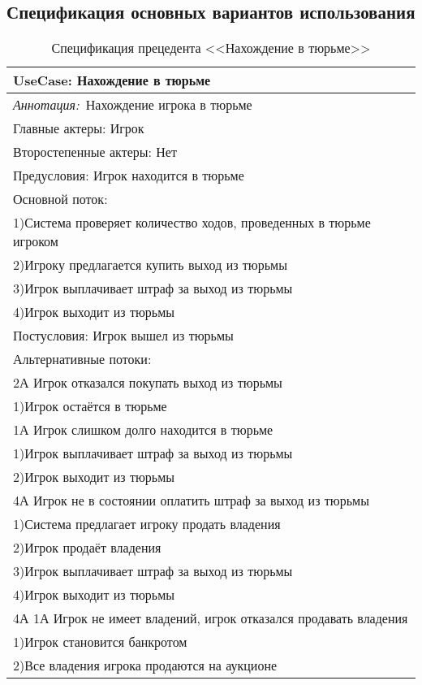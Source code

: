 \subsection{Спецификация основных вариантов использования}
\newpage
\begin{table}[h!]
\caption{Спецификация прецедента <<Нахождение в тюрьме>>}
\begin{tabular}{|l|}
    \hline
    \textbf{UseCase: Нахождение в тюрьме}\\
    \hline
    \textit{Аннотация:}\ Нахождение игрока в тюрьме\\
    \hline
    Главные актеры: Игрок \\
    \hline
    Второстепенные актеры: Нет \\
    \hline
    Предусловия: Игрок находится в тюрьме \\
    \hline
    Основной поток: \\
        1)Система проверяет количество ходов, проведенных в тюрьме игроком \\
        2)Игроку предлагается купить выход из тюрьмы \\
        3)Игрок выплачивает штраф за выход из тюрьмы \\
        4)Игрок выходит из тюрьмы \\
    \hline
    Постусловия: Игрок вышел из тюрьмы\\
    \hline
    Альтернативные потоки:\\
    2А Игрок отказался покупать выход из тюрьмы\\
    1)Игрок остаётся в тюрьме\\
    1А Игрок слишком долго находится в тюрьме\\
    1)Игрок выплачивает штраф за выход из тюрьмы\\
    2)Игрок выходит из тюрьмы\\
    4А Игрок не в состоянии оплатить штраф за выход из тюрьмы\\
    1)Система предлагает игроку продать владения\\
    2)Игрок продаёт владения\\
    3)Игрок выплачивает штраф за выход из тюрьмы\\
    4)Игрок выходит из тюрьмы\\
    4А 1А Игрок не имеет владений, игрок отказался продавать владения\\
    1)Игрок становится банкротом\\
    2)Все владения игрока продаются на аукционе\\
    \hline
\end{tabular}  
\end{table}
